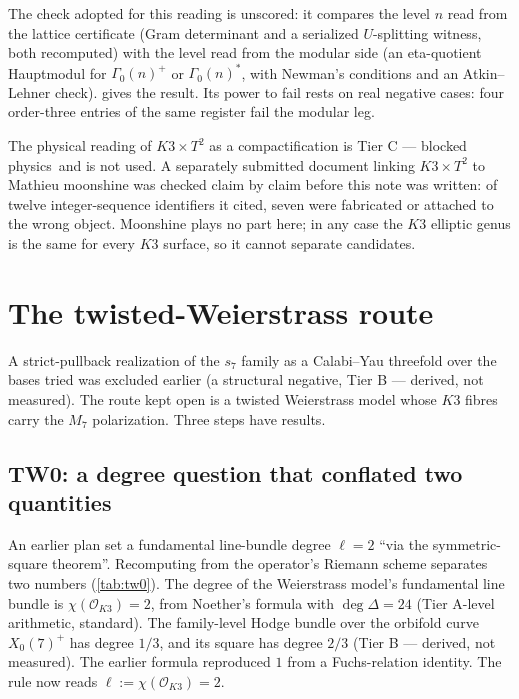 \documentclass[11pt,a4paper]{article}
\theoremstyle{remark}
\newcommand{\tierA}{\colorbox{green!15}{\textsf{\scriptsize Tier A}}}
\newcommand{\tierB}{\colorbox{yellow!20}{\textsf{\scriptsize Tier B --- derived, not measured}}}
\newcommand{\tierC}{\colorbox{orange!15}{\textsf{\scriptsize Tier C --- blocked physics}}}
\begin{document}
The check adopted for this reading is unscored: it compares the level $n$ read from the lattice certificate
(Gram determinant and a serialized $U$-splitting witness, both recomputed) with the level read from the
modular side (an eta-quotient Hauptmodul for $\Gamma_0(n)^+$ or $\Gamma_0(n)^*$, with Newman's conditions
and an Atkin--Lehner check).  gives the result. Its power to fail rests on real negative
cases: four order-three entries of the same register fail the modular leg.

\begin{table}[h]
\centering

\caption{Lattice level against modular level. An unscored consistency gate, never a ranking.}\label{tab:t3}
\end{table}

The physical reading of $K3\times T^2$ as a compactification is \tierC\ and is not used. A separately
submitted document linking $K3\times T^2$ to Mathieu moonshine was checked claim by claim before this note
was written: of twelve integer-sequence identifiers it cited, seven were fabricated or attached to the wrong
object. Moonshine plays no part here; in any case the $K3$ elliptic genus is the same for every $K3$ surface,
so it cannot separate candidates.

\section{The twisted-Weierstrass route}\label{sec:tw}

A strict-pullback realization of the $s_7$ family as a Calabi--Yau threefold over the bases tried was
excluded earlier (a structural negative, \tierB). The route kept open is a twisted Weierstrass model whose
$K3$ fibres carry the $M_7$ polarization. Three steps have results.

\subsection{TW0: a degree question that conflated two quantities}

An earlier plan set a fundamental line-bundle degree $\ell=2$ ``via the symmetric-square theorem''.
Recomputing from the operator's Riemann scheme separates two numbers (\cref{tab:tw0}). The degree of the
Weierstrass model's fundamental line bundle is $\chi(\mathcal{O}_{K3})=2$, from Noether's formula with
$\deg\Delta=24$ (\tierA-level arithmetic, standard). The family-level Hodge bundle over the orbifold curve
$X_0(7)^+$ has degree $1/3$, and its square has degree $2/3$ (\tierB). The earlier formula reproduced $1$
from a Fuchs-relation identity. The rule now reads $\ell:=\chi(\mathcal{O}_{K3})=2$.
\end{document}
